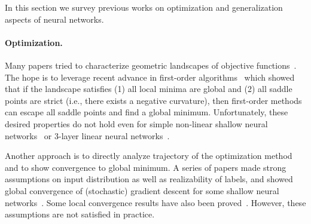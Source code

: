 In this section we survey previous works on optimization and generalization aspects of neural networks.

\paragraph{Optimization.}
Many papers tried to characterize geometric landscapes of objective functions~\citep{safran2017spurious,zhou2017critical,freeman2016topology,hardt2016identity,nguyen2017loss,kawaguchi2016deep,venturi2018neural,soudry2016no,du2018power,soltanolkotabi2018theoretical,haeffele2015global}.
The hope is to leverage recent advance in first-order algorithms~\citep{ge2015escaping,lee2016gradient,jin2017escape} which showed that if the landscape satisfies (1) all local minima are global and (2) all saddle points are strict (i.e., there exists a negative curvature), then first-order methods can escape all saddle points and find a global minimum.
Unfortunately, these desired properties do not hold even for simple non-linear shallow neural networks~\citep{yun2018critical} or 3-layer linear neural networks~\citep{kawaguchi2016deep}.

%



Another approach is to directly analyze trajectory of the optimization method and to show convergence to global minimum.
A series of papers made strong assumptions on input distribution as well as realizability of labels, and showed global convergence of (stochastic) gradient descent for some shallow neural networks~\citep{tian2017analytical,soltanolkotabi2017learning,brutzkus2017globally,du2017convolutional,du2017spurious,li2017convergence}.
Some local convergence results have also been proved~\citep{zhong2017recovery,zhang2018learning}.
However, these assumptions are not satisfied in practice.


